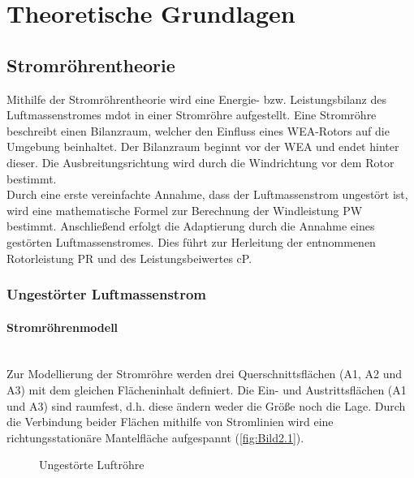 \section{Theoretische Grundlagen} \label{theo_grundl}

\subsection{Stromröhrentheorie}
Mithilfe der Stromröhrentheorie wird eine Energie- bzw. Leistungsbilanz des Luftmassenstromes \acs{mdot} in einer Stromröhre aufgestellt. Eine Stromröhre beschreibt einen Bilanzraum, welcher den Einfluss eines WEA-Rotors auf die Umgebung beinhaltet. Der Bilanzraum beginnt vor der WEA und endet hinter dieser. Die Ausbreitungsrichtung wird durch die Windrichtung vor dem Rotor bestimmt. \\
Durch eine erste vereinfachte Annahme, dass der Luftmassenstrom ungestört ist, wird eine mathematische Formel zur Berechnung der Windleistung \acs{PW} bestimmt. Anschließend erfolgt die Adaptierung durch die Annahme eines gestörten Luftmassenstromes. Dies führt zur Herleitung der entnommenen Rotorleistung \acs{PR} und des Leistungsbeiwertes \acs{cP}.

\subsubsection{Ungestörter Luftmassenstrom}

\paragraph{Stromröhrenmodell}\mbox{}\smallskip\\
Zur Modellierung der Stromröhre werden drei Querschnittsflächen (\acs{A1}, \acs{A2} und \acs{A3}) mit dem gleichen Flächeninhalt definiert. Die Ein- und Austrittsflächen (\acs{A1} und \acs{A3}) sind raumfest, d.h. diese ändern weder die Größe noch die Lage. Durch die Verbindung beider Flächen mithilfe von Stromlinien wird eine richtungsstationäre Mantelfläche aufgespannt (\autoref{fig:Bild2.1}).\\
\begin{figure}[H]
   \centering
   \caption[Ungestörte Luftröhre]{Ungestörte Luftröhre}
   \label{fig:Bild2.1}
\end{figure}

